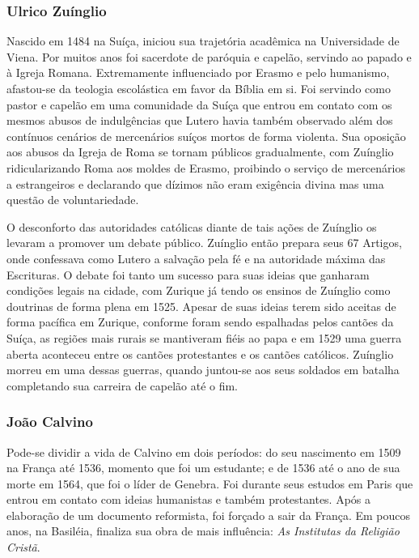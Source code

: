 \documentclass[
    article,            %
	12pt,				%
	oneside,			%
	a4paper,			%
	chapter=TITLE,		%
	section=TITLE,		%
	english,			%
	french,				%
	spanish,			%
	brazil				%
	]{abntex2}
\begin{document}
\subsubsection{Ulrico Zuínglio}
Nascido em 1484 na Suíça, iniciou sua trajetória acadêmica na Universidade de Viena. Por muitos anos foi sacerdote de paróquia e capelão, servindo ao papado e à Igreja Romana. Extremamente influenciado por Erasmo e pelo humanismo, afastou-se da teologia escolástica em favor da Bíblia em si. Foi servindo como pastor e capelão em uma comunidade da Suíça que entrou em contato com os mesmos abusos de indulgências que Lutero havia também observado além dos contínuos cenários de mercenários suíços mortos de forma violenta. Sua oposição aos abusos da Igreja de Roma se tornam públicos gradualmente, com Zuínglio ridicularizando Roma aos moldes de Erasmo, proibindo o serviço de mercenários a estrangeiros e declarando que dízimos não eram exigência divina mas uma questão de voluntariedade.

O desconforto das autoridades católicas diante de tais ações de Zuínglio os levaram a promover um debate público. Zuínglio então prepara seus 67 Artigos, onde confessava como Lutero a salvação pela fé e na autoridade máxima das Escrituras. O debate foi tanto um sucesso para suas ideias que ganharam condições legais na cidade, com Zurique já tendo os ensinos de Zuínglio como doutrinas de forma plena em 1525. Apesar de suas ideias terem sido aceitas de forma pacífica em Zurique, conforme foram sendo espalhadas pelos cantões da Suíça, as regiões mais rurais se mantiveram fiéis ao papa e em 1529 uma guerra aberta aconteceu entre os cantões protestantes e os cantões católicos. Zuínglio morreu em uma dessas guerras, quando juntou-se aos seus soldados em batalha completando sua carreira de capelão até o fim.

\subsubsection{João Calvino}
Pode-se dividir a vida de Calvino em dois períodos: do seu nascimento em 1509 na França até 1536, momento que foi um estudante; e de 1536 até o ano de sua morte em 1564, que foi o líder de Genebra. Foi durante seus estudos em Paris que entrou em contato com ideias humanistas e também protestantes. Após a elaboração de um documento reformista, foi forçado a sair da França. Em poucos anos, na Basiléia, finaliza sua obra de mais influência: \emph{As Institutas da Religião Cristã}.
\end{document}
